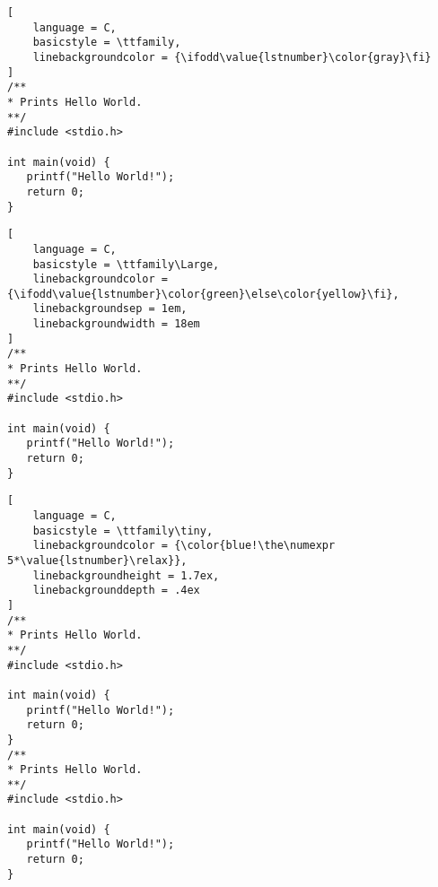 \documentclass{article}
\begin{document}
\begin{lstlisting}[
	language = C,
	basicstyle = \ttfamily,
	linebackgroundcolor = {\ifodd\value{lstnumber}\color{gray}\fi}
]
/**
* Prints Hello World.
**/
#include <stdio.h>

int main(void) {
   printf("Hello World!");
   return 0;
}
\end{lstlisting}


\begin{lstlisting}[
	language = C,
	basicstyle = \ttfamily\Large,
	linebackgroundcolor = {\ifodd\value{lstnumber}\color{green}\else\color{yellow}\fi},
	linebackgroundsep = 1em,
	linebackgroundwidth = 18em
]
/**
* Prints Hello World.
**/
#include <stdio.h>

int main(void) {
   printf("Hello World!");
   return 0;
}
\end{lstlisting}


\begin{lstlisting}[
	language = C,
	basicstyle = \ttfamily\tiny,
	linebackgroundcolor = {\color{blue!\the\numexpr 5*\value{lstnumber}\relax}},
	linebackgroundheight = 1.7ex,
	linebackgrounddepth = .4ex
]
/**
* Prints Hello World.
**/
#include <stdio.h>

int main(void) {
   printf("Hello World!");
   return 0;
}
/**
* Prints Hello World.
**/
#include <stdio.h>

int main(void) {
   printf("Hello World!");
   return 0;
}
\end{lstlisting}
\end{document}
